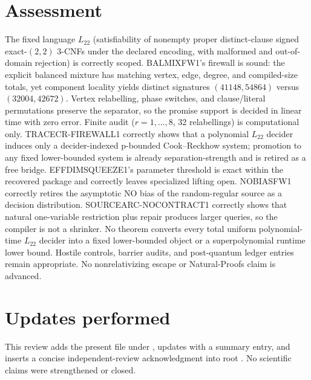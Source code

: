 \documentclass[11pt]{article}
\begin{document}
\section{Assessment}
The fixed language \(L_{22}\) (satisfiability of nonempty proper distinct-clause signed exact-\((2,2)\) 3-CNFs under the declared encoding, with malformed and out-of-domain rejection) is correctly scoped.
BALMIXFW1's firewall is sound: the explicit balanced mixture has matching vertex, edge, degree, and compiled-size totals, yet component locality yields distinct signatures \((41148,54864)\) versus \((32004,42672)\).  Vertex relabelling, phase switches, and clause/literal permutations preserve the separator, so the promise support is decided in linear time with zero error.  Finite audit (\(r=1,\ldots,8\), 32 relabellings) is computational only.
TRACECR-FIREWALL1 correctly shows that a polynomial \(L_{22}\) decider induces only a decider-indexed p-bounded Cook--Reckhow system; promotion to any fixed lower-bounded system is already separation-strength and is retired as a free bridge.
EFFDIMSQUEEZE1's parameter threshold is exact within the recovered package and correctly leaves specialized lifting open.
NOBIASFW1 correctly retires the asymptotic NO bias of the random-regular source as a decision distribution.
SOURCEARC-NOCONTRACT1 correctly shows that natural one-variable restriction plus repair produces larger queries, so the compiler is not a shrinker.
No theorem converts every total uniform polynomial-time \(L_{22}\) decider into a fixed lower-bounded object or a superpolynomial runtime lower bound.  Hostile controls, barrier audits, and post-quantum ledger entries remain appropriate.  No nonrelativizing escape or Natural-Proofs claim is advanced.

\section{Updates performed}
This review adds the present file under , updates  with a summary entry, and inserts a concise independent-review acknowledgment into root .  No scientific claims were strengthened or closed.
\end{document}

